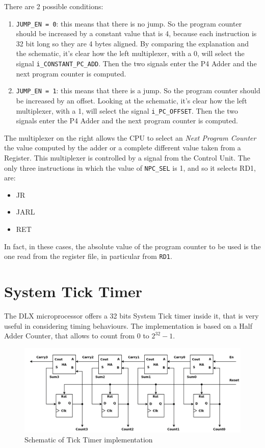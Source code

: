 There are 2 possible conditions:

\begin{enumerate}
  \item \texttt{JUMP\_EN = 0}: this means that there is no jump. So the program counter should be increased by a constant value that is 4, because each instruction is 32 bit long so they are 4 bytes aligned. By comparing the explanation and the schematic, it's clear how the left multiplexer, with a 0, will select the signal \texttt{i\_CONSTANT\_PC\_ADD}. Then the two signals enter the P4 Adder and the next program counter is computed.  
  \item \texttt{JUMP\_EN = 1}: this means that there is a jump. So the program counter should be increased by an offset. Looking at the schematic, it's clear how the left multiplexer, with a 1, will select the signal \texttt{i\_PC\_OFFSET}. Then the two signals enter the P4 Adder and the next program counter is computed. 
\end{enumerate}

The multiplexer on the right allows the CPU to select an \emph{Next Program Counter} the value computed by the adder or a complete different value taken from  a Register. This multiplexer is controlled by a signal from the Control Unit. The only three instructions in which the value of \texttt{NPC\_SEL} is 1, and so it selects RD1, are:

\begin{itemize}
  \item JR
  \item JARL
  \item RET
\end{itemize}

In fact, in these cases, the absolute value of the program counter to be used is the one read from the register file, in particular from \texttt{RD1}.

\newpage
\section{System Tick Timer}

The DLX microprocessor offers a 32 bits System Tick timer inside it, that is very useful in considering timing behaviours. The implementation is based on a Half Adder Counter, that allows to count from 0 to $2^{32} - 1$.

\begin{figure}[H]
	\centering
	\includegraphics[width=1.0\textwidth]{chapters/4_DecodeStage/images/ha_counter.png}
	\caption{Schematic of Tick Timer implementation}
	\label{ticktmr_hacounter}
\end{figure}

